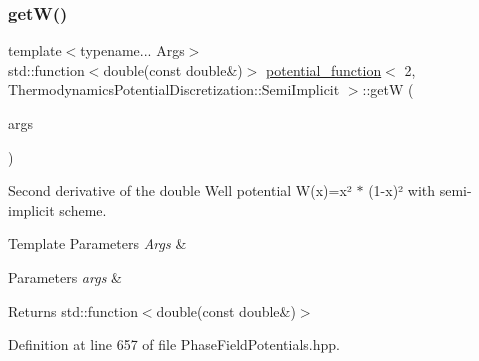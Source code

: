 \subsubsection{\texorpdfstring{get\+W()}{getW()}}
{\footnotesize\ttfamily template$<$typename... Args$>$ \\
std\+::function$<$double(const double\&)$>$ \hyperlink{structpotential__function}{potential\+\_\+function}$<$ 2, Thermodynamics\+Potential\+Discretization\+::\+Semi\+Implicit $>$\+::getW (\begin{DoxyParamCaption}\item[{Args...}]{args }\end{DoxyParamCaption})\hspace{0.3cm}{\ttfamily [inline]}}



Second derivative of the double Well potential W(x)=x² $\ast$ (1-\/x)² with semi-\/implicit scheme. 


\begin{DoxyTemplParams}{Template Parameters}
{\em Args} & \\
\hline
\end{DoxyTemplParams}

\begin{DoxyParams}{Parameters}
{\em args} & \\
\hline
\end{DoxyParams}
\begin{DoxyReturn}{Returns}
std\+::function$<$double(const double\&)$>$ 
\end{DoxyReturn}


Definition at line 657 of file Phase\+Field\+Potentials.\+hpp.


